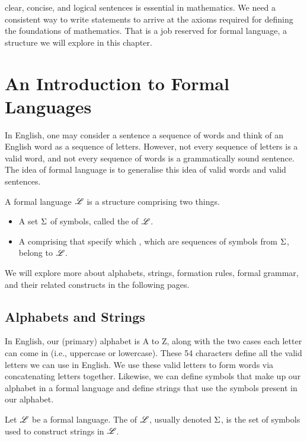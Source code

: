  clear, concise, and logical sentences is essential in mathematics. We need a consistent way to write statements to arrive at the axioms required for defining the foundations of mathematics. That is a job reserved for formal language, a structure we will explore in this chapter.

\section{An Introduction to Formal Languages}
In English, one may consider a sentence a sequence of words and think of an English word as a sequence of letters. However, not every sequence of letters is a valid word, and not every sequence of words is a grammatically sound sentence. The idea of formal language is to generalise this idea of valid words and valid sentences.

\begin{definition}
    A formal language $\mathscr{L}$ is a structure comprising two things.
    \begin{itemize}
        \item A set $\Sigma$ of symbols, called the  of $\mathscr{L}$.
        \item A  comprising  that specify which , which are sequences of symbols from $\Sigma$, belong to $\mathscr{L}$.
    \end{itemize}
\end{definition}

We will explore more about alphabets, strings, formation rules, formal grammar, and their related constructs in the following pages.

\subsection{Alphabets and Strings}
In English, our (primary) alphabet is A to Z, along with the two cases each letter can come in (i.e., uppercase or lowercase). These 54 characters define all the valid letters we can use in English. We use these valid letters to form words via concatenating letters together. Likewise, we can define symbols that make up our alphabet in a formal language and define strings that use the symbols present in our alphabet.

\begin{definition}[Alphabet]
    Let $\mathscr{L}$ be a formal language. The  of $\mathscr{L}$, usually denoted $\Sigma$, is the set of symbols used to construct strings in $\mathscr{L}$.
\end{definition}

